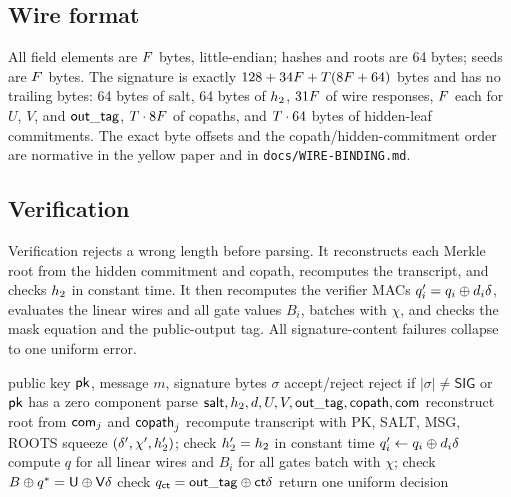 \documentclass[11pt,a4paper]{article}
\begin{document}
\subsection{Wire format}
\label{sec:wire}

All field elements are $F$ bytes, little-endian; hashes and roots are
64 bytes; seeds are $F$ bytes. The signature is exactly
$128+34F+T(8F+64)$ bytes and has no trailing bytes:
64 bytes of salt, 64 bytes of $h_2$, $31F$ of wire responses,
$F$ each for $U$, $V$, and $\mathsf{out\_tag}$, $T\cdot8F$ of
copaths, and $T\cdot64$ bytes of hidden-leaf commitments. The exact
byte offsets and the copath/hidden-commitment order are normative in the
yellow paper and in \texttt{docs/WIRE-BINDING.md}.

\subsection{Verification}

Verification rejects a wrong length before parsing. It reconstructs each
Merkle root from the hidden commitment and copath, recomputes the transcript,
and checks $h_2$ in constant time. It then recomputes the verifier MACs
$q_i'=q_i\oplus d_i\delta$, evaluates the linear wires and all gate values
$B_i$, batches with $\chi$, and checks the mask equation and the public-output
tag. All signature-content failures collapse to one uniform error.

\begin{algorithm}[ht]
\small
\caption{$\Verify(\pk,m,\sigma)$ (informative)}
\label{alg:verify}
\begin{algorithmic}[1]
\REQUIRE public key $\mathsf{pk}$, message $m$, signature bytes $\sigma$
\ENSURE accept/reject
\STATE reject if $|\sigma|\ne\mathsf{SIG}$ or $\mathsf{pk}$ has a zero component
\STATE parse $\mathsf{salt},h_2,d,U,V,\mathsf{out\_tag},\mathsf{copath},\mathsf{com}$
  \STATE reconstruct root from $\mathsf{com}_j$ and $\mathsf{copath}_j$
\ENDFOR
\STATE recompute transcript with PK, SALT, MSG, ROOTS
\STATE squeeze $(\delta',\chi',h_2')$; check $h_2'=h_2$ in constant time
  \STATE $q_i'\gets q_i\oplus d_i\delta$
\ENDFOR
\STATE compute $q$ for all linear wires and $B_i$ for all gates
\STATE batch with $\chi$; check $B\oplus q^\ast=\mathsf{U}\oplus\mathsf{V}\delta$
\STATE check $q_{\mathsf{ct}}=\mathsf{out\_tag}\oplus\mathsf{ct}\delta$
\STATE return one uniform decision
\end{algorithmic}
\end{algorithm}
\end{document}
